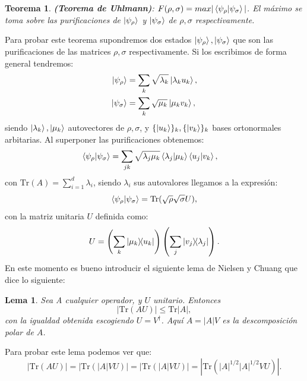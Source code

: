 \documentclass[letterpaper,12pt]{thesisECFM}
\theoremstyle{plain}
\newtheorem{thm}{Teorema}[section]
\newtheorem{lem}{Lema}[chapter]
\theoremstyle{definition}
\theoremstyle{definition}
\theoremstyle{remark}
\newcommand{\1}{\mathbb{1}}
\begin{document}
    \begin{thm}
    \textbf{(Teorema de Uhlmann)}: $F(\rho,\sigma) = max |\braket{\psi_\rho}{\psi_\sigma}|$. El máximo se toma sobre las purificaciones de $\ket{\psi_\rho}$ y $\ket{\psi_\sigma}$ de $\rho,\sigma$ respectivamente. 
    \end{thm}
     Para probar este teorema supondremos dos estados $\ket{\psi_\rho},\ket{\psi_\sigma}$ que son las purificaciones de las matrices $\rho,\sigma$ respectivamente. Si los escribimos de forma general tendremos:
    \begin{align}
        \ket{\psi_\rho} & = \sum_k \sqrt{\lambda_k} \ket{\lambda_k u_k},\\
        \ket{\psi_\sigma} & = \sum_k \sqrt{\mu_k} \ket{\mu_k v_k},       
    \end{align}
    siendo $\ket{\lambda_k},\ket{\mu_k}$ autovectores de $\rho,\sigma$, y $\{\ket{u_k} \}_k, \{\ket{v_k} \}_k$ bases ortonormales arbitarias. Al superponer las purificaciones obtenemos:
    \begin{align}
        \braket{\psi_\rho}{\psi_\sigma} & = \sum_{jk} \sqrt{\lambda_j\mu_k} \braket{\lambda_j}{\mu_k} \braket{u_j}{v_k},
    \end{align}
    con $\text{Tr}(A) = \sum_{i=1}^{d} \lambda_i$, siendo $\lambda_i$ sus autovalores llegamos a la expresión:
    \begin{equation}
    \label{eq:rho_ij0}
        \braket{\psi_\rho}{\psi_\sigma} = \text{Tr}(\sqrt{\rho}\sqrt{\sigma} U),
    \end{equation}
    con la matriz unitaria $U$ definida como:
    \begin{equation}
        U = \left(\sum_k \ketbra{\mu_k}{u_k}    \right)  \left(\sum_j \ketbra{v_j} {\lambda_j}   \right).
    \end{equation} 
    En este momento es bueno introducir el siguiente lema de Nielsen y Chuang \cite{nielsen_chuang_2011} que dice lo siguiente:
    \begin{lem}  Sea A cualquier operador, y $U$ unitario. Entonces
    \begin{equation}
        | \text{Tr}(AU)| \leq \text{Tr}|A|,
    \end{equation}
    con la igualdad obtenida escogiendo $U= V^\dagger$. Aquí $A= |A|V$ es la descomposición polar de $A$.
    \end{lem}
    Para probar este lema podemos ver que:
    \begin{equation}
        |\text{Tr}(AU)| = |\text{Tr}(|A|VU)| = \left| \text{Tr}(|A|VU ) \right| = \left|\text{Tr}(|A|^{1/2}|A|^{1/2} VU)   \right|.
    \end{equation}
\end{document}
